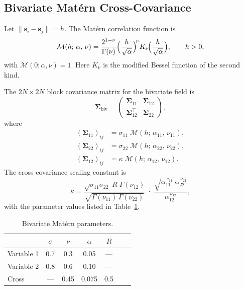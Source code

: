 \documentclass[11pt,a4paper]{article}
\newcommand{\bs}{\bm{s}}
\newcommand{\bSigma}{\bm{\Sigma}}
\begin{document}
\subsection{Bivariate Mat\'ern Cross-Covariance}

Let $\|\bs_i-\bs_j\|=h$.  The Mat\'ern correlation function is
\begin{equation}\label{eq:matern}
  \mathcal{M}(h;\,\alpha,\,\nu)
  = \frac{2^{1-\nu}}{\Gamma(\nu)}
    \Bigl(\frac{h}{\sqrt{\alpha}}\Bigr)^{\!\nu}
    K_{\nu}\!\Bigl(\frac{h}{\sqrt{\alpha}}\Bigr),
  \qquad h>0,
\end{equation}
with $\mathcal{M}(0;\alpha,\nu)=1$.
Here $K_\nu$ is the modified Bessel function of the second kind.

The $2N\times 2N$ block covariance matrix for the bivariate field is
\[
  \bSigma_{\text{biv}} =
  \begin{pmatrix}
    \bSigma_{11} & \bSigma_{12}\\
    \bSigma_{12}^\top & \bSigma_{22}
  \end{pmatrix},
\]
where
\begin{align}
  (\bSigma_{11})_{ij} &= \sigma_{11}\;\mathcal{M}(h;\,\alpha_{11},\,\nu_{11}), \\
  (\bSigma_{22})_{ij} &= \sigma_{22}\;\mathcal{M}(h;\,\alpha_{22},\,\nu_{22}), \\
  (\bSigma_{12})_{ij} &= \kappa\;\mathcal{M}(h;\,\alpha_{12},\,\nu_{12}).
\end{align}
The cross-covariance scaling constant is
\[
  \kappa
  = \frac{\sqrt{\sigma_{11}\sigma_{22}}\;R\;
          \Gamma(\nu_{12})}
         {\sqrt{\Gamma(\nu_{11})\,\Gamma(\nu_{22})}}
  \;\cdot\;
  \frac{\sqrt{\alpha_{11}^{\,\nu_{11}}\;\alpha_{22}^{\,\nu_{22}}}}
       {\alpha_{12}^{\,\nu_{12}}},
\]
with the parameter values listed in Table~\ref{tab:params}.

\begin{table}[h]
\centering
\caption{Bivariate Mat\'ern parameters.}\label{tab:params}
\smallskip
\begin{tabular}{@{}lcccccc@{}}
\toprule
 & $\sigma$ & $\nu$ & $\alpha$ & $R$ \\
\midrule
Variable 1 & 0.7 & 0.3 & 0.05 & --- \\
Variable 2 & 0.8 & 0.6 & 0.10 & --- \\
Cross      & --- & 0.45 & 0.075 & 0.5 \\
\bottomrule
\end{tabular}
\end{table}
\end{document}
